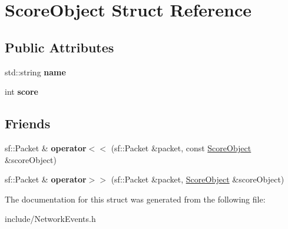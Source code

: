 \hypertarget{struct_score_object}{\section{Score\-Object Struct Reference}
\label{struct_score_object}
}
\subsection*{Public Attributes}
\begin{DoxyCompactItemize}
\item 
\hypertarget{struct_score_object_ab978f157e91ca14ed929cd4a0cabc205}{std\-::string {\bfseries name}}\label{struct_score_object_ab978f157e91ca14ed929cd4a0cabc205}

\item 
\hypertarget{struct_score_object_a2fcc4391a8eb6ba7d0abc3e5eb511a97}{int {\bfseries score}}\label{struct_score_object_a2fcc4391a8eb6ba7d0abc3e5eb511a97}

\end{DoxyCompactItemize}
\subsection*{Friends}
\begin{DoxyCompactItemize}
\item 
\hypertarget{struct_score_object_a4242d42272a6f241b88cbfeddab12fa4}{sf\-::\-Packet \& {\bfseries operator$<$$<$} (sf\-::\-Packet \&packet, const \hyperlink{struct_score_object}{Score\-Object} \&score\-Object)}\label{struct_score_object_a4242d42272a6f241b88cbfeddab12fa4}

\item 
\hypertarget{struct_score_object_a4dd140f98a350a014bdd36e1a345d0ee}{sf\-::\-Packet \& {\bfseries operator$>$$>$} (sf\-::\-Packet \&packet, \hyperlink{struct_score_object}{Score\-Object} \&score\-Object)}\label{struct_score_object_a4dd140f98a350a014bdd36e1a345d0ee}

\end{DoxyCompactItemize}


The documentation for this struct was generated from the following file\-:\begin{DoxyCompactItemize}
\item 
include/Network\-Events.\-h\end{DoxyCompactItemize}
